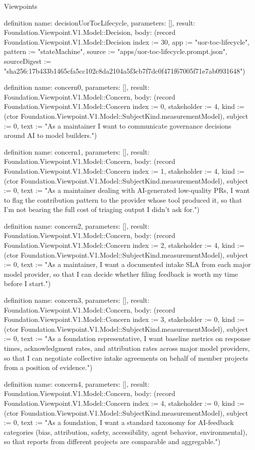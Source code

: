 \begin{lexlean}{Viewpoints}
\begin{semanticmodule}
definition{
  name: decisionUorTocLifecycle,
  parameters: [],
  result: Foundation.Viewpoint.V1.Model::Decision,
  body: (record Foundation.Viewpoint.V1.Model::Decision {index := 30, app := "uor-toc-lifecycle", pattern := "stateMachine", source := "apps/uor-toc-lifecycle.prompt.json", sourceDigest := "sha256:17b433b1465cfa5cc102c8da2104a5f3cb7f7dc0f471f67005f71e7ab0931648"})
}

definition{
  name: concern0,
  parameters: [],
  result: Foundation.Viewpoint.V1.Model::Concern,
  body: (record Foundation.Viewpoint.V1.Model::Concern {index := 0, stakeholder := 4, kind := (ctor Foundation.Viewpoint.V1.Model::SubjectKind.measurementModel), subject := 0, text := "As a maintainer I want to communicate governance decisions around AI to model builders."})
}

definition{
  name: concern1,
  parameters: [],
  result: Foundation.Viewpoint.V1.Model::Concern,
  body: (record Foundation.Viewpoint.V1.Model::Concern {index := 1, stakeholder := 4, kind := (ctor Foundation.Viewpoint.V1.Model::SubjectKind.measurementModel), subject := 0, text := "As a maintainer dealing with AI-generated low-quality PRs, I want to flag the contribution pattern to the provider whose tool produced it, so that I'm not bearing the full cost of triaging output I didn't ask for."})
}

definition{
  name: concern2,
  parameters: [],
  result: Foundation.Viewpoint.V1.Model::Concern,
  body: (record Foundation.Viewpoint.V1.Model::Concern {index := 2, stakeholder := 4, kind := (ctor Foundation.Viewpoint.V1.Model::SubjectKind.measurementModel), subject := 0, text := "As a maintainer, I want a documented intake SLA from each major model provider, so that I can decide whether filing feedback is worth my time before I start."})
}

definition{
  name: concern3,
  parameters: [],
  result: Foundation.Viewpoint.V1.Model::Concern,
  body: (record Foundation.Viewpoint.V1.Model::Concern {index := 3, stakeholder := 0, kind := (ctor Foundation.Viewpoint.V1.Model::SubjectKind.measurementModel), subject := 0, text := "As a foundation representative, I want baseline metrics on response times, acknowledgment rates, and attribution rates across major model providers, so that I can negotiate collective intake agreements on behalf of member projects from a position of evidence."})
}

definition{
  name: concern4,
  parameters: [],
  result: Foundation.Viewpoint.V1.Model::Concern,
  body: (record Foundation.Viewpoint.V1.Model::Concern {index := 4, stakeholder := 0, kind := (ctor Foundation.Viewpoint.V1.Model::SubjectKind.measurementModel), subject := 0, text := "As a foundation, I want a standard taxonomy for AI-feedback categories (bias, attribution, safety, accessibility, agent behavior, environmental), so that reports from different projects are comparable and aggregable."})
}


\end{semanticmodule}
\end{lexlean}
